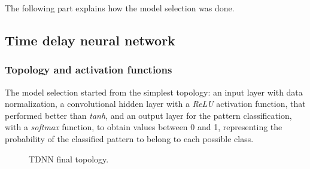 The following part explains how the model selection was done.
\bigbreak

\subsection{Time delay neural network}
\subsubsection{Topology and activation functions}
The model selection started from the simplest topology: an input layer with data normalization, a convolutional hidden layer with a \textit{ReLU} activation function, that performed better than \textit{tanh}, and an output layer for the pattern classification, with a \textit{softmax} function, to obtain values between 0 and 1, representing the probability of the classified pattern to belong to each possible class.
\bigbreak

\begin{center}
	\begin{figure}[ht!]
		\caption{TDNN final topology.}
	\end{figure}
\end{center}

